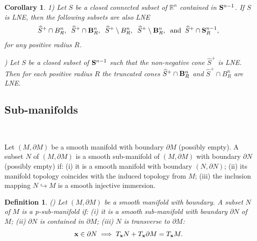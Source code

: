 \documentclass[11pt]{amsart}
\newtheorem{corollary}[theorem]{Corollary}
\newtheorem{definition}[theorem]{Definition}
\newcommand{\field}[1]{\mathbb{#1}}
\newcommand{\R}{\field{R}}
\newcommand{\wh}[1]{\widehat{#1}}
\newcommand{\aph}{{\alpha}}
\newcommand{\bbo}{{\bf 0}}
\newcommand{\bB}{{\bf B}}
\newcommand{\bS}{{\bf S}}
\newcommand{\bu}{{\bf u}}
\newcommand{\bx}{{\bf x}}
\newcommand{\dd}{{\partial}}
\newcommand{\dist}{{\rm dist}}
\newcommand{\dlt}{{\delta}}
\newcommand{\inn}{{{\rm in}}}
\newcommand{\Rn}{{\R^n}}
\numberwithin{equation}{section}
\numberwithin{equation}{section}
\begin{document}
%
%
%
\begin{corollary}\label{cor:cone-LNE}
	1) Let $S$ be a closed connected subset of $\Rn$ contained in $\bS^{n-1}$.
	If $S$ is LNE, then the following subsets are also LNE
	$$
	\wh{S}^+ \cap B_R^n, \;\; \wh{S}^+ \cap \bB_R^n, \;\; 
	\wh{S}^+ \setminus B_R^n, \;\; \wh{S}^+ \setminus \bB_R^n, \;\;  
	{\rm and} \;\; \wh{S}^+ \cap \bS_R^{n-1}, 
	$$ 
	for any positive radius $R$.
	
	\medskip{}) Let $S$ be a closed subset of $\bS^{n-1}$ such that the non-negative cone 
	$\wh{S}^+$ is LNE. Then for each positive radius $R$ the truncated cones 
	$\wh{S}^+\cap \bB_R^n$ and $\wh{S}^+\cap B_R^n$ are LNE. 
\end{corollary}
%
%

%
%
%
%
%
%
%
%
%
%
%
%
%
%
%
%
%
%
%
%
%
%
%
%
%
%
%
% 
%
%
%
%
%
%
%
%
%
%
%
%
%
%
%
%
%
%
%
%







\subsection{Sub-manifolds}
$ $

Let $(M,\dd M)$ be a smooth manifold with boundary $\dd M$ (possibly empty).
A subset $N$ of $(M,\dd M)$ is a smooth sub-manifold of $(M,\dd 
M)$ with boundary $\dd N$ (possibly empty) if: (i) 
it is a smooth manifold with boundary $(N,\dd N)$; (ii) its manifold 
topology coincides with the induced topology from $M$; (iii) the 
inclusion mapping $N \hookrightarrow M$ is a smooth injective immersion.
%
%
\begin{definition}\label{def:p-sub}(\cite[Section I.7]{Mel})
	Let $(M,\dd M)$ be a smooth manifold with boundary. A subset $N$ of $M$ is a 
	\em p-sub-manifold \em if: (i) it is a smooth sub-manifold with boundary $\dd 
	N$ of $M$; (ii) $\dd N$ is contained in $\dd M$; (iii) $N$ is transverse to 
	$\dd M$:
	$$
	\bx \in \dd N \; \Longrightarrow \; T_\bx N + T_\bx \dd M = T_\bx M.
	$$
\end{definition}
%
%
%
%
%
%
%
%
%
%
%
%
\end{document}
